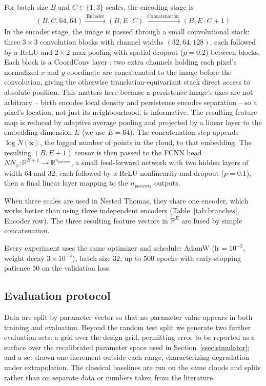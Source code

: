 \documentclass[11pt,a4paper]{article}
\newcommand{\R}{\mathbb{R}}
\newcommand{\pc}{\mathbf{x}}
\theoremstyle{definitioncolon}
\begin{document}
For batch size $B$ and $C\in\{1,3\}$ scales, the encoding stage is
\begin{align*}
    (B, C, 64, 64) \xrightarrow{\;\text{Encoder}\;} (B,E \cdot C) \xrightarrow{\;\text{Concatenation}\;} (B,E \cdot C+1)
\end{align*}
In the encoder stage, the image is passed through a small
convolutional stack: three $3\times3$ convolution blocks with channel widths
$(32, 64, 128)$, each followed by a ReLU and $2\times2$ max-pooling with
spatial dropout ($p=0.2$) between blocks. Each block is a CoordConv layer
\citep{liu2018coordconv}: two extra channels holding each pixel's
normalized $x$ and $y$ coordinate are concatenated to the image before the
convolution, giving the otherwise translation-equivariant stack direct
access to absolute position. This matters here because a persistence
image's axes are not arbitrary -- birth encodes local density and
persistence encodes separation -- so a pixel's location, not just its
neighbourhood, is informative. The resulting
feature map is reduced by adaptive average pooling and projected by a linear
layer to the embedding dimension $E$ (we use $E=64$).
The concatenation step appends $\log N(\pc)$, the logged number of points in
the cloud, to that embedding. The
resulting $(B, E + 1)$ tensor is then passed to the FCNN head
$NN_\phi: \R^{E + 1} \to \R^{n_{params}}$, a small feed-forward network with
two hidden layers of width 64 and
32, each followed by a ReLU nonlinearity and dropout ($p=0.1$), then a final
linear layer mapping to the $n_{params}$ outputs.

When three scales are used in Nested Thomas, they share one encoder, which works better than using three independent encoders (Table~\ref{tab:branches}, Encoder row). The three resulting feature vectors in $\R^E$ are fused by simple concatenation.

Every experiment uses the same optimizer and schedule: AdamW ($\text{lr}=10^{-3}$,
weight decay $3\times10^{-4}$), batch size $32$, up to $500$ epochs with
early-stopping patience $50$ on the validation loss.

\subsection{Evaluation protocol}
\label{ssec:eval}

Data are split by parameter vector so that no parameter
value appears in both training and evaluation. Beyond the random test split we
generate two further evaluation sets: a grid over the design grid, permitting
error to be reported as a surface over the recalibrated parameter space used in
Section~\ref{ssec:simulator}; and a set drawn
one increment outside each range, characterizing
degradation under extrapolation. The classical baselines are run on the same
clouds and splits rather than on
separate data or numbers taken from the literature.
\end{document}
